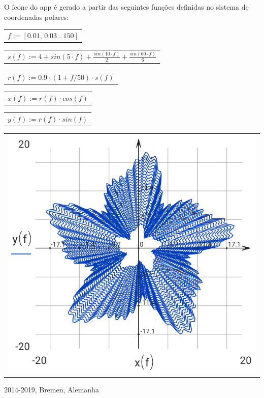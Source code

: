 \documentclass[DIV=calc, paper=a4, fontsize=11pt, twocolumn]{scrartcl}
\begin{document}
O ícone do app é gerado a partir das
seguintes funções definidas no sistema
de coordenadas polares:
\begin{center}\begin{tabular}{c}
                $f := \left[ 0.01,\, 0.03 \,..\, 150 \right]$
\end{tabular}\end{center}
\begin{center}\begin{tabular}{c}
                $s(f) := 4 + sin \left( 5 \cdot f\right)  + \frac{sin \left( 10 \cdot f\right) }{2} + \frac{sin \left( 60 \cdot f\right) }{6}$
\end{tabular}\end{center}
\begin{center}\begin{tabular}{c}
                $r(f) := 0.9 \cdot \left( 1 + f / 50 \right) \cdot s \left( f\right) $
\end{tabular}\end{center}
\begin{center}\begin{tabular}{c}
                $x(f) := r \left( f\right)  \cdot cos \left( f\right) $
\end{tabular}\end{center}
\begin{center}\begin{tabular}{c}
                $y(f) := r \left( f\right)  \cdot sin \left( f\right) $
\end{tabular}\end{center}
\begin{center}\begin{tabular}{c} \includegraphics[resolution=320]{graphics/about_micromath_fig1.png} \end{tabular}\end{center}

2014-2019, Bremen, Alemanha
\end{document}
